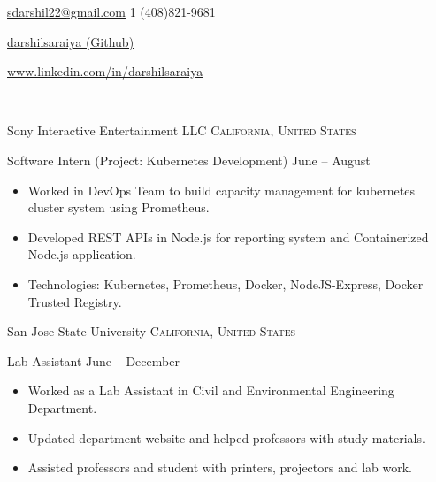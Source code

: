 \documentclass[10pt,a4paper]{article}
\begin{document}
\sloppy  %



\nobreakvspace{0.4em}  %

\noindent\href{mailto:sdarshil22.at.gmail.dot.com}{sdarshil22\mbox{}@\mbox{}gmail.com}\sbull
\textsmaller{+}1 (408)821-9681\sbull
{\newnums \href{https://github.com/darshilsaraiya}{darshilsaraiya (Github)}\sbull
{\mewmums \href{https://www.linkedin.com/in/darshilsaraiya/}{www.linkedin.com/in/darshilsaraiya}\sbull
{
\\
{%
}


\spacedhrule{0.0em}{-0.4em}



\headedsection  %
  {Sony Interactive Entertainment LLC}
  {\textsc{California, United States}} {%
  \headedsubsection
    {Software Intern (Project: Kubernetes Development)}
    {June  -- August }
    {\bodytext
    {
    \begin{itemize}
        \item Worked in DevOps Team to build capacity management for kubernetes cluster system using Prometheus. 
        \item Developed REST APIs in Node.js for reporting system and Containerized Node.js application.
        \item Technologies: Kubernetes, Prometheus, Docker, NodeJS-Express, Docker Trusted Registry.
    \end{itemize}}}
}

\headedsection  %
  {San Jose State University}
  {\textsc{California, United States}} {%
  \headedsubsection
    {Lab Assistant}
    {June  -- December }
    {\bodytext
    {
    \begin{itemize}
        \item Worked as a Lab Assistant in Civil and Environmental Engineering Department.
        \item Updated department website and helped professors with study materials.
        \item Assisted professors and student with printers, projectors and lab work.
    \end{itemize}}}
}

}}}
\end{document}

